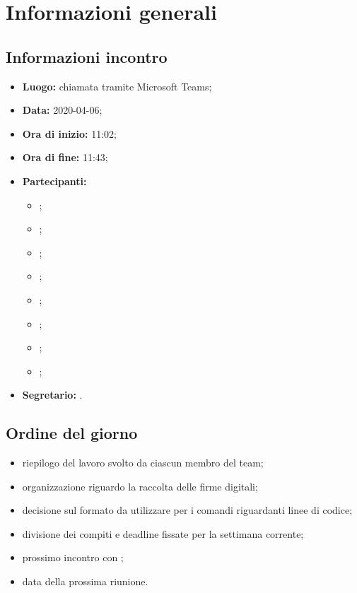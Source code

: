 \section{Informazioni generali}
\subsection{Informazioni incontro}
\begin{itemize}
	\item \textbf{Luogo:} chiamata tramite Microsoft Teams; 
	\item \textbf{Data:} 2020-04-06;
	\item \textbf{Ora di inizio:} 11:02; 
	\item \textbf{Ora di fine:} 11:43; 
	\item \textbf{Partecipanti:}
		\begin{itemize}
			\item \VB; 
			\item \LB; 
			\item \NF; 
			\item \EG; 
			\item \FJ; 
			\item \MP; 
			\item \AS; 
			\item \AZ; 
		\end{itemize}
	\item \textbf{Segretario:} \NF. 
\end{itemize}

\subsection{Ordine del giorno}
\begin{itemize}
	\item riepilogo del lavoro svolto da ciascun membro del team;
	\item organizzazione riguardo la raccolta delle firme digitali;
	\item decisione sul formato da utilizzare per i comandi riguardanti linee di codice;
	\item divisione dei compiti e deadline fissate per la settimana corrente;
	\item prossimo incontro con \Proponente{};
	\item data della prossima riunione.
\end{itemize}
